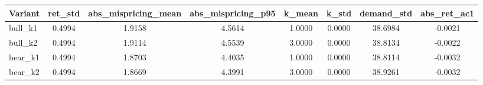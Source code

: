 \begin{tabular}{lccccccc}
\hline
Variant & ret_std & abs_mispricing_mean & abs_mispricing_p95 & k_mean & k_std & demand_std & abs_ret_ac1 \\
\hline
bull_k1 & 0.4994 & 1.9158 & 4.5614 & 1.0000 & 0.0000 & 38.6984 & -0.0021 \\
bull_k2 & 0.4994 & 1.9114 & 4.5539 & 3.0000 & 0.0000 & 38.8134 & -0.0022 \\
bear_k1 & 0.4994 & 1.8703 & 4.4035 & 1.0000 & 0.0000 & 38.8114 & -0.0032 \\
bear_k2 & 0.4994 & 1.8669 & 4.3991 & 3.0000 & 0.0000 & 38.9261 & -0.0032 \\
\hline
\end{tabular}
